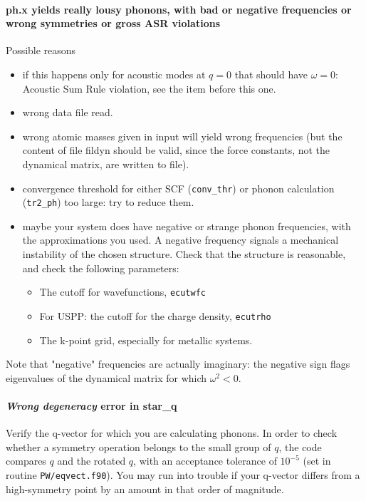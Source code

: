 \documentclass[12pt,a4paper]{article}
\begin{document}
\paragraph{ph.x yields really lousy phonons, with bad or negative
  frequencies or wrong symmetries or gross ASR violations} 
Possible reasons
\begin{itemize}
\item if this happens only for acoustic modes at $q=0$ that should
  have $\omega=0$: Acoustic Sum Rule violation, see the item before
  this one.
\item wrong data file read.
\item wrong atomic masses given in input will yield wrong frequencies
  (but the content of file fildyn should be valid, since the force
  constants, not the dynamical matrix, are written to file). 
\item convergence threshold for either SCF (\texttt{conv\_thr}) or phonon
  calculation (\texttt{tr2\_ph}) too large: try to reduce them. 
\item maybe your system does have negative or strange phonon
  frequencies, with the approximations you used. A negative frequency
  signals a mechanical instability of the chosen structure. Check that
  the structure is reasonable, and check the following parameters: 
\begin{itemize}
\item The cutoff for wavefunctions, \texttt{ecutwfc}
\item For USPP: the cutoff for the charge density, \texttt{ecutrho}
\item The k-point grid, especially for metallic systems.
\end{itemize}
\end{itemize}
Note that "negative" frequencies are actually imaginary: the negative
sign flags eigenvalues of the dynamical matrix for which $\omega^2 <
0$. 

\paragraph{{\em Wrong degeneracy} error in star\_q}
Verify the q-vector for which you are calculating phonons. In order to
check whether a symmetry operation belongs to the small group of $q$,
the code compares $q$ and the rotated $q$, with an acceptance tolerance of  
$10^{-5}$ (set in routine \texttt{PW/eqvect.f90}). You may run into trouble if
your q-vector differs from a high-symmetry point by an amount in that
order of magnitude.
\end{document}
